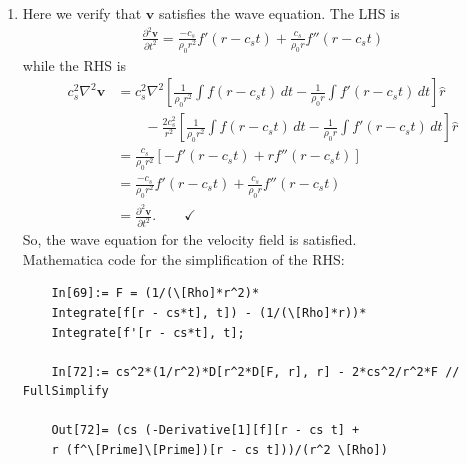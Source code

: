 \documentclass{article}
\theoremstyle{definition}
\newcommand{\p}{\partial}
\newcommand{\f}[2]{\frac{#1}{#2}}
\newcommand{\lb}{\left[}
\newcommand{\rb}{\right]}
\begin{document}
\begin{enumerate}[label=(\alph*)]
	
	\item Here we verify that $\mathbf{v}$ satisfies the wave equation. The LHS is 
	\begin{align*}
	\f{\p^2 \mathbf{v}}{\p t^2} = \f{-c_s}{\rho_0 r^2} f'(r- c_s t) +  \f{c_s}{\rho_0 r} f''(r-c_s t)
	\end{align*}
	while the RHS is 
	\begin{align*}
	c_s^2 \nabla^2 \mathbf{v} &= 
	c_s^2  \nabla^2 \lb \f{1}{\rho_0 r^2} \int f(r-c_s t)\,dt - \f{1}{\rho_0 r }\int f' (r-c_s t) \,dt \rb \hat{r} \\
	&\quad\quad - \f{2c_s^2}{r^2}\lb \f{1}{\rho_0 r^2} \int f(r-c_s t)\,dt - \f{1}{\rho_0 r }\int f' (r-c_s t) \,dt \rb \hat{r} \\
	&= \f{c_s }{\rho_0  r^2}\lb -f'(r-c_s t) + rf''(r - c_s t)\rb \\
	&= \f{-c_s}{\rho_0 r^2} f'(r- c_s t) +  \f{c_s}{\rho_0 r} f''(r-c_s t) \\
	&= \f{\p ^2 \mathbf{v}}{\p t^2}. \quad\quad \checkmark
	\end{align*}
	So, the wave equation for the velocity field is satisfied. \\
	
	
	Mathematica code for the simplification of the RHS:
	\begin{lstlisting}
	In[69]:= F = (1/(\[Rho]*r^2)*
	Integrate[f[r - cs*t], t]) - (1/(\[Rho]*r))*
	Integrate[f'[r - cs*t], t];
	
	In[72]:= cs^2*(1/r^2)*D[r^2*D[F, r], r] - 2*cs^2/r^2*F // FullSimplify
	
	Out[72]= (cs (-Derivative[1][f][r - cs t] + 
	r (f^\[Prime]\[Prime])[r - cs t]))/(r^2 \[Rho])
	\end{lstlisting}
	
\end{enumerate}
\end{document}

